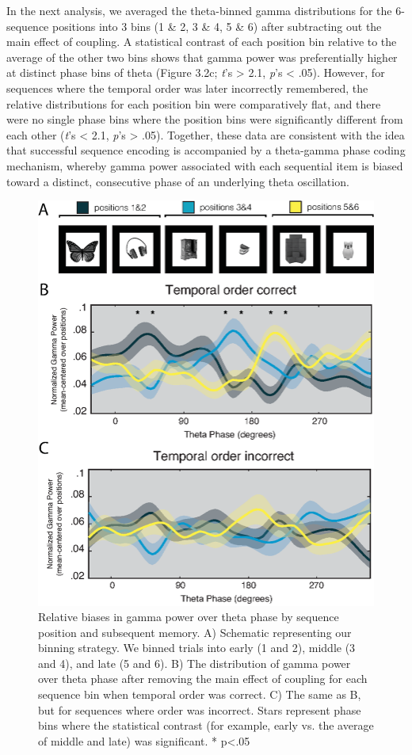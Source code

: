 In the next analysis, we averaged the theta-binned gamma distributions
for the 6-sequence positions into 3 bins (1 \& 2, 3 \& 4, 5 \& 6) after
subtracting out the main effect of coupling. A statistical contrast of
each position bin relative to the average of the other two bins shows
that gamma power was preferentially higher at distinct phase bins of
theta (Figure 3.2c; \emph{t}'s \textgreater{} 2.1, \emph{p}'s
\textless{} .05). However, for sequences where the temporal order was
later incorrectly remembered, the relative distributions for each
position bin were comparatively flat, and there were no single phase
bins where the position bins were significantly different from each
other (\emph{t}'s \textless{} 2.1, \emph{p}'s \textgreater{} .05).
Together, these data are consistent with the idea that successful
sequence encoding is accompanied by a theta-gamma phase coding
mechanism, whereby gamma power associated with each sequential item is
biased toward a distinct, consecutive phase of an underlying theta
oscillation.

\begin{figure}
  \centering
  \includegraphics[width=.75\textwidth]{figures/chapter3_figure3.eps}
  \caption[Relative biases in gamma power over theta phase by sequence position and subsequent memory]{Relative biases in gamma power over theta phase by sequence position and subsequent memory.  A) Schematic representing our binning strategy.  We binned trials into early (1 and 2), middle (3 and 4), and late (5 and 6).  B) The distribution of gamma power over theta phase after removing the main effect of coupling for each sequence bin when temporal order was correct.  C) The same as B, but for sequences where order was incorrect. Stars represent phase bins where the statistical contrast (for example, early vs. the average of middle and late) was significant.  * p<.05}
  \label{chapter3_figure3}
\end{figure}

